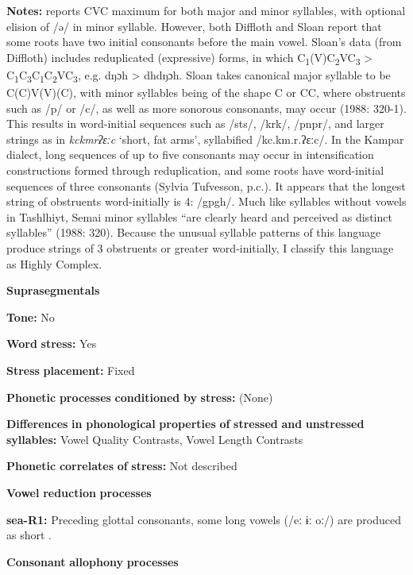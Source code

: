 \begin{styleBody}
\textbf{Notes:} \citet{Philips2007} reports CVC maximum for both major and minor syllables, with optional elision of /ə/ in minor syllable. However, both Diffloth and Sloan report that some roots have two initial consonants before the main vowel. Sloan’s data (from Diffloth) includes reduplicated (expressive) forms, in which C\textsubscript{1}(V)C\textsubscript{2}VC\textsubscript{3} > C\textsubscript{1}C\textsubscript{3}C\textsubscript{1}C\textsubscript{2}VC\textsubscript{3}, e.g. dŋɔh > dhdŋɔh. Sloan takes canonical major syllable to be C(C)V(V)(C), with minor syllables being of the shape C or CC, where obstruents such as /p/ or /c/, as well as more sonorous consonants, may occur (1988: 320-1). This results in word-initial sequences such as /sts/, /krk/, /pnpr/, and larger strings as in \textit{kckmrʔɛːc} ‘short, fat arms’, syllabified /kc.km.r.ʔɛːc/. In the Kampar dialect, long sequences of up to five consonants may occur in intensification constructions formed through reduplication, and some roots have word-initial sequences of three consonants (Sylvia Tufvesson, p.c.). It appears that the longest string of obstruents word-initially is 4: /gpgh/. Much like syllables without vowels in Tashlhiyt, Semai minor syllables “are clearly heard and perceived as distinct syllables” (1988: 320). Because the unusual syllable patterns of this language produce strings of 3 obstruents or greater word-initially, I classify this language as Highly Complex.

\textbf{Suprasegmentals}

\textbf{Tone:} No

\textbf{Word} \textbf{stress:} Yes

\textbf{Stress} \textbf{placement:} Fixed

\textbf{Phonetic} \textbf{processes} \textbf{conditioned} \textbf{by} \textbf{stress:} (None)

\textbf{Differences} \textbf{in} \textbf{phonological} \textbf{properties} \textbf{of} \textbf{stressed} \textbf{and} \textbf{unstressed} \textbf{syllables:} Vowel Quality Contrasts, Vowel Length Contrasts

\textbf{Phonetic} \textbf{correlates} \textbf{of} \textbf{stress:} Not described

\textbf{Vowel} \textbf{reduction} \textbf{processes}

\textbf{sea-R1:} Preceding glottal consonants, some long vowels (/eː ɨː oː/) are produced as short \citep[10-11]{Philips2007}.

\textbf{Consonant} \textbf{allophony} \textbf{processes}


\end{styleBody}
